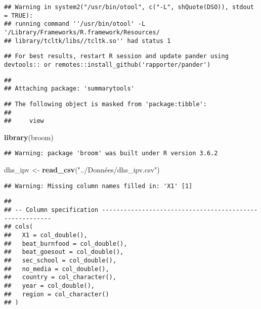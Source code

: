 \documentclass[
]{article}
\newenvironment{Shaded}{\begin{snugshade}}{\end{snugshade}}
\newcommand{\KeywordTok}[1]{\textcolor[rgb]{0.13,0.29,0.53}{\textbf{#1}}}
\newcommand{\NormalTok}[1]{#1}
\newcommand{\StringTok}[1]{\textcolor[rgb]{0.31,0.60,0.02}{#1}}
\begin{document}
\begin{verbatim}
## Warning in system2("/usr/bin/otool", c("-L", shQuote(DSO)), stdout = TRUE):
## running command ''/usr/bin/otool' -L '/Library/Frameworks/R.framework/Resources/
## library/tcltk/libs//tcltk.so'' had status 1
\end{verbatim}

\begin{verbatim}
## For best results, restart R session and update pander using devtools:: or remotes::install_github('rapporter/pander')
\end{verbatim}

\begin{verbatim}
## 
## Attaching package: 'summarytools'
\end{verbatim}

\begin{verbatim}
## The following object is masked from 'package:tibble':
## 
##     view
\end{verbatim}

\begin{Shaded}
\begin{Highlighting}[]
\KeywordTok{library}\NormalTok{(broom)}
\end{Highlighting}
\end{Shaded}

\begin{verbatim}
## Warning: package 'broom' was built under R version 3.6.2
\end{verbatim}

\begin{Shaded}
\begin{Highlighting}[]
\NormalTok{dhs_ipv <-}\StringTok{ }\KeywordTok{read_csv}\NormalTok{(}\StringTok{"../Données/dhs_ipv.csv"}\NormalTok{)}
\end{Highlighting}
\end{Shaded}

\begin{verbatim}
## Warning: Missing column names filled in: 'X1' [1]
\end{verbatim}

\begin{verbatim}
## 
## -- Column specification --------------------------------------------------------
## cols(
##   X1 = col_double(),
##   beat_burnfood = col_double(),
##   beat_goesout = col_double(),
##   sec_school = col_double(),
##   no_media = col_double(),
##   country = col_character(),
##   year = col_double(),
##   region = col_character()
## )
\end{verbatim}
\end{document}
